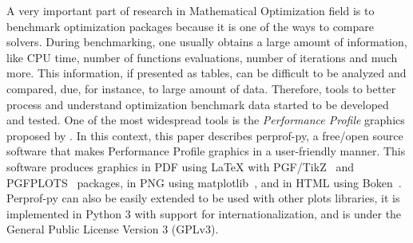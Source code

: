 A very important part of research in Mathematical Optimization field is to benchmark
optimization packages because it is one of the ways to compare
solvers.
During benchmarking, one usually
obtains a large amount of information, like CPU time, number of functions
evaluations, number of iterations and much more. This information, if
presented as tables, can be difficult to be analyzed and compared, due, for instance, to
large amount of data.  Therefore, 
tools to better process and understand optimization benchmark data  started to be developed and tested. One of
the most widespread tools  is the \emph{Performance Profile} graphics proposed by
\textcite{Dolan:2002du}. In this context, this paper describes  perprof-py, a free/open source software
that makes Performance Profile graphics in a user-friendly manner. This software produces graphics in PDF using LaTeX with
PGF/TikZ~\cite{TikZ} and PGFPLOTS~\cite{pgfplots} packages, in
PNG using matplotlib~\cite{Hunter:2007}, and in HTML using
Boken~\cite{url:bokeh}. Perprof-py  can also be easily
extended to be used with other plots libraries,  it is implemented
in Python 3 with support for internationalization, and is under the General
Public License Version 3 (GPLv3).
